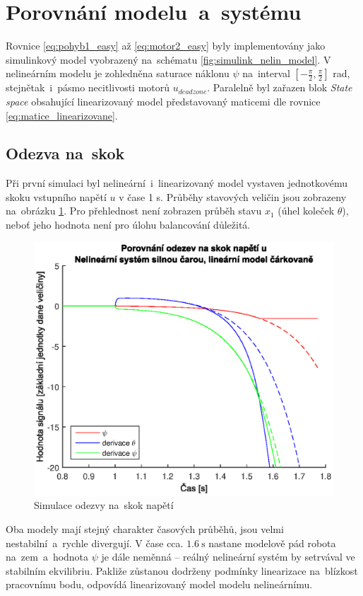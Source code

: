 \documentclass[conference]{IEEEtran}
\begin{document}
\section{Porovnání modelu~a~systému}

Rovnice \eqref{eq:pohyb1_easy} až \eqref{eq:motor2_easy} byly implementovány jako simulinkový model vyobrazený na~schématu \ref{fig:simulink_nelin_model}.
V nelineárním modelu je zohledněna saturace náklonu $\psi$ na~interval $[-\frac{\pi}{2}, \frac{\pi}{2}]$ rad, stejnětak~i~pásmo necitlivosti motorů $u_{deadzone}$.
Paralelně byl zařazen blok \textit{State space} obsahující linearizovaný model představovaný maticemi dle rovnice \eqref{eq:matice_linearizovane}.
\subsection{Odezva na~skok}
Při první simulaci byl nelineární~i~linearizovaný model
vystaven jednotkovému skoku vstupního napětí $u$ v čase 1 \si{\second}. Průběhy stavových veličin jsou zobrazeny na~obrázku \ref{fig:porovnani_skok}.
Pro přehlednost není zobrazen průběh stavu $x_1$ (úhel koleček $\theta$), neboť jeho hodnota není pro úlohu balancování důležitá.
\begin{figure}[htbp]
    \centerline{\includegraphics[width=\linewidth]{porovnani_skok.eps}}
    \caption{Simulace odezvy na~skok napětí}
    \label{fig:porovnani_skok}        
\end{figure}
Oba modely mají stejný charakter časových průběhů, jsou velmi nestabilní~a~rychle divergují.
V čase cca. $1.6~\si{\second}$ nastane modelově pád robota na~zem~a~hodnota $\psi$ je dále neměnná -- reálný nelineární systém by setrvával ve stabilním ekvilibriu.
Pakliže zůstanou dodrženy podmínky linearizace na~blízkost pracovnímu bodu, odpovídá linearizovaný model modelu nelineárnímu.
\end{document}
